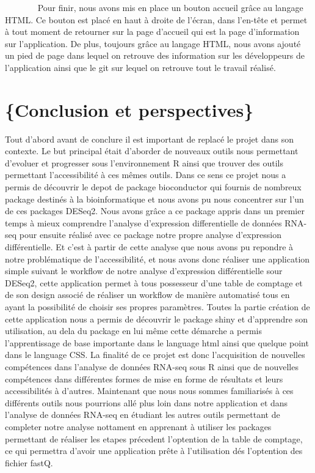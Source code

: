 \documentclass[
  12pt,
]{article}
\begin{document}
\par

~~~~~~~ Pour finir, nous avons mis en place un bouton accueil grâce au
langage HTML. Ce bouton est placé en haut à droite de l'écran, dans
l'en-tête et permet à tout moment de retourner sur la page d'accueil qui
est la page d'information sur l'application. De plus, toujours grâce au
langage HTML, nous avons ajouté un pied de page dans lequel on retrouve
des information sur les développeurs de l'application ainsi que le git
sur lequel on retrouve tout le travail réalisé.

\newpage

\hypertarget{conclusion-et-perspectives}{%
\section{\texorpdfstring{\Large\{Conclusion et
perspectives\}}{\{Conclusion et perspectives\}}}\label{conclusion-et-perspectives}}

Tout d'abord avant de conclure il est important de replacé le projet
dans son contexte. Le but principal était d'aborder de nouveaux outils
nous permettant d'evoluer et progresser sous l'environnement R ainsi que
trouver des outils permettant l'accessibilité à ces mêmes outils. Dans
ce sens ce projet nous a permis de découvrir le depot de package
bioconductor qui fournis de nombreux package destinés à la
bioinformatique et nous avons pu nous concentrer sur l'un de ces
packages DESeq2. Nous avons grâce a ce package appris dans un premier
temps à mieux comprendre l'analyse d'expression differentielle de
données RNA-seq pour ensuite réalisé avec ce package notre propre
analyse d'expression différentielle. Et c'est à partir de cette analyse
que nous avons pu repondre à notre problématique de l'accessibilité, et
nous avons donc réaliser une application simple suivant le workflow de
notre analyse d'expression différentielle sour DESeq2, cette application
permet à tous possesseur d'une table de comptage et de son design
associé de réaliser un workflow de manière automatisé tous en ayant la
possibilité de choisir ses propres paramètres. Toutes la partie création
de cette application nous a permis de découvrir le package shiny et
d'apprendre son utilisation, au dela du package en lui même cette
démarche a permis l'apprentissage de base importante dans le language
html ainsi que quelque point dans le language CSS. La finalité de ce
projet est donc l'acquisition de nouvelles compétences dans l'analyse de
données RNA-seq sous R ainsi que de nouvelles compétences dans
différentes formes de mise en forme de résultats et leurs accessibilités
à d'autres. Maintenant que nous nous sommes familiarisés à ces
différents outils nous pourrions allé plus loin dans notre application
et dans l'analyse de données RNA-seq en étudiant les autres outils
permettant de completer notre analyse nottament en apprenant à utiliser
les packages permettant de réaliser les etapes précedent l'optention de
la table de comptage, ce qui permettra d'avoir une application prête à
l'utilisation dés l'optention des fichier fastQ.
\end{document}

